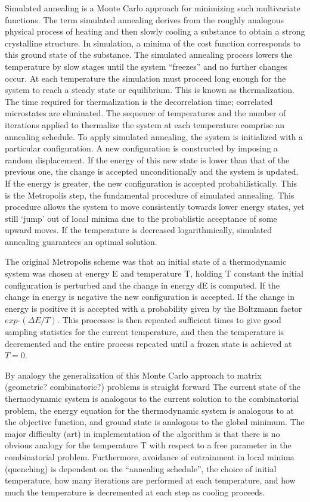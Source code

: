 \documentclass[superscriptaddress,reprint,amsmath,amssymb,aps]{revtex4-1}
\begin{document}
Simulated annealing is a Monte Carlo approach for minimizing such
multivariate functions. The term simulated annealing derives from the
roughly analogous physical process of heating and then slowly cooling a
substance to obtain a strong crystalline structure. In simulation, a minima
of the cost function corresponds to this ground state of the substance. The
simulated annealing process lowers the temperature by slow stages until the
system ``freezes'' and no further changes occur. At each temperature the
simulation must proceed long enough for the system to reach a steady state
or equilibrium. This is known as thermalization. The time required for
thermalization is the decorrelation time; correlated microstates are
eliminated. The sequence of temperatures and the number of iterations
applied to thermalize the system at each temperature comprise an annealing
schedule.  To apply simulated annealing, the system is initialized with a
particular configuration. A new configuration is constructed by imposing a
random displacement. If the energy of this new state is lower than that of
the previous one, the change is accepted unconditionally and the system is
updated. If the energy is greater, the new configuration is accepted
probabilistically. This is the Metropolis step, the fundamental procedure
of simulated annealing. This procedure allows the system to move
consistently towards lower energy states, yet still ‘jump’ out of local
minima due to the probablistic acceptance of some upward moves. If the
temperature is decreased logarithmically, simulated annealing guarantees an
optimal solution.

The original Metropolis scheme was that an initial state of a thermodynamic
system was chosen at energy E and temperature T, holding T constant the
initial configuration is perturbed and the change in energy dE is computed.
If the change in energy is negative the new configuration is accepted. If
the change in energy is positive it is accepted with a probability given by
the Boltzmann factor $exp ‐(\Delta E/T)$.  This processes is then repeated
sufficient times to give good sampling statistics for the current
temperature, and then the temperature is decremented and the entire process
repeated until a frozen state is achieved at $T=0$.

By analogy the generalization of this Monte Carlo approach to matrix
(geometric? combinatoric?) problems is straight forward The current state
of the thermodynamic system is analogous to the current solution to the
combinatorial problem, the energy equation for the thermodynamic system is
analogous to at the objective function, and ground state is analogous to
the global minimum. The major difficulty (art) in implementation of the
algorithm is that there is no obvious analogy for the temperature T with
respect to a free parameter in the combinatorial problem. Furthermore,
avoidance of entrainment in local minima (quenching) is dependent on the
``annealing schedule'', the choice of initial temperature, how many
iterations are performed at each temperature, and how much the temperature
is decremented at each step as cooling proceeds.
\end{document}
